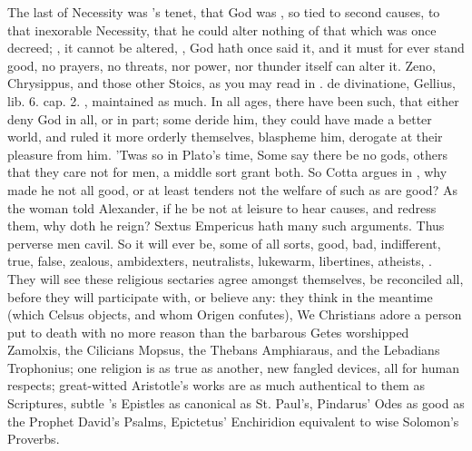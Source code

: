 {The last of Necessity was \Seneca's tenet, that God was , so tied to second causes, to that inexorable Necessity, that
he could alter nothing of that which was once decreed; , it cannot be altered, , God hath once said it, and it
must for ever stand good, no prayers, no threats, nor power, nor
thunder itself can alter it. Zeno, Chrysippus, and those other Stoics,
as you may read in . de divinatione, Gellius, lib. 6. cap. 2.
\etc{}, maintained as much. In all ages, there have been such, that either
deny God in all, or in part; some deride him, they could have made a
better world, and ruled it more orderly themselves, blaspheme him,
derogate at their pleasure from him. 'Twas so in Plato's time,
Some say there be no gods, others that they care not for men, a middle
sort grant both.  So
Cotta argues in \Tully, why made he not all good, or at least tenders
not the welfare of such as are good? As the woman told Alexander, if he
be not at leisure to hear causes, and redress them, why doth he reign?
Sextus Empericus hath many such arguments. Thus perverse men
cavil. So it will ever be, some of all sorts, good, bad, indifferent,
true, false, zealous, ambidexters, neutralists, lukewarm, libertines,
atheists, \etc{}. They will see these religious sectaries agree amongst
themselves, be reconciled all, before they will participate with, or
believe any: they think in the meantime (which Celsus objects,
and whom Origen confutes), We Christians adore a person put to
death with no more reason than the barbarous Getes worshipped
Zamolxis, the Cilicians Mopsus, the Thebans Amphiaraus, and the
Lebadians Trophonius; one religion is as true as another, new fangled
devices, all for human respects; great-witted Aristotle's works are as
much authentical to them as Scriptures, subtle \Seneca's Epistles as
canonical as St. Paul's, Pindarus' Odes as good as the Prophet David's
Psalms, Epictetus' Enchiridion equivalent to wise Solomon's Proverbs.

}
